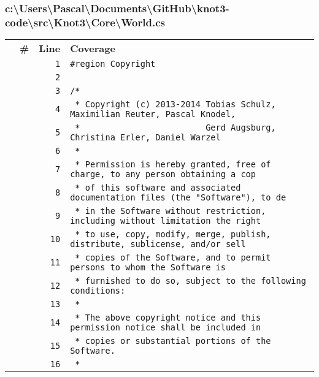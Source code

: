 \documentclass[a4paper,10pt]{article}
\begin{document}
\subsubsection{c:\textbackslash Users\textbackslash Pascal\textbackslash Documents\textbackslash GitHub\textbackslash knot3-code\textbackslash src\textbackslash Knot3\textbackslash Core\textbackslash World.cs}
\begin{longtable}[l]{lrrl}
\textbf{} & \textbf{\#} & \textbf{Line} & \textbf{Coverage}\\
\cellcolor{gray} &  & \verb~1~ & \verb~#region Copyright~\\
\cellcolor{gray} &  & \verb~2~ & \verb~~\\
\cellcolor{gray} &  & \verb~3~ & \verb~/*~\\
\cellcolor{gray} &  & \verb~4~ & \verb~ * Copyright (c) 2013-2014 Tobias Schulz, Maximilian Reuter, Pascal Knodel,~\\
\cellcolor{gray} &  & \verb~5~ & \verb~ *                         Gerd Augsburg, Christina Erler, Daniel Warzel~\\
\cellcolor{gray} &  & \verb~6~ & \verb~ *~\\
\cellcolor{gray} &  & \verb~7~ & \verb~ * Permission is hereby granted, free of charge, to any person obtaining a cop~\\
\cellcolor{gray} &  & \verb~8~ & \verb~ * of this software and associated documentation files (the "Software"), to de~\\
\cellcolor{gray} &  & \verb~9~ & \verb~ * in the Software without restriction, including without limitation the right~\\
\cellcolor{gray} &  & \verb~10~ & \verb~ * to use, copy, modify, merge, publish, distribute, sublicense, and/or sell~\\
\cellcolor{gray} &  & \verb~11~ & \verb~ * copies of the Software, and to permit persons to whom the Software is~\\
\cellcolor{gray} &  & \verb~12~ & \verb~ * furnished to do so, subject to the following conditions:~\\
\cellcolor{gray} &  & \verb~13~ & \verb~ *~\\
\cellcolor{gray} &  & \verb~14~ & \verb~ * The above copyright notice and this permission notice shall be included in ~\\
\cellcolor{gray} &  & \verb~15~ & \verb~ * copies or substantial portions of the Software.~\\
\cellcolor{gray} &  & \verb~16~ & \verb~ *~\\

\end{longtable}
\end{document}

